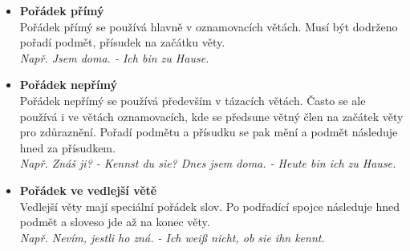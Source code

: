 \documentclass[12pt,a4paper]{report}
\begin{document}
\begin{itemize}
\item
\textbf{Pořádek přímý}\\
Pořádek přímý se používá hlavně v oznamovacích větách. Musí být dodrženo pořadí podmět, přísudek na začátku věty.\\
\textit{Např. Jsem doma. - Ich bin zu Hause.}

\item
\textbf{Pořádek nepřímý}\\
Pořádek nepřímý se používá především v tázacích větách. Často se ale používá i ve větách oznamovacích, kde se předsune větný člen na začátek věty pro zdůraznění. Pořadí podmětu a přísudku se pak mění a podmět následuje hned za přísudkem.\\
\textit{Např. Znáš ji? - Kennst du sie? Dnes jsem doma. - Heute bin ich zu Hause.}

\item
\textbf{Pořádek ve vedlejší větě}\\
Vedlejší věty mají speciální pořádek slov. Po podřadící spojce následuje hned podmět a sloveso jde až na konec věty.\\
\textit{Např. Nevím, jestli ho zná. - Ich weiß nicht, ob sie ihn kennt.}
\end{itemize}
\end{document}
